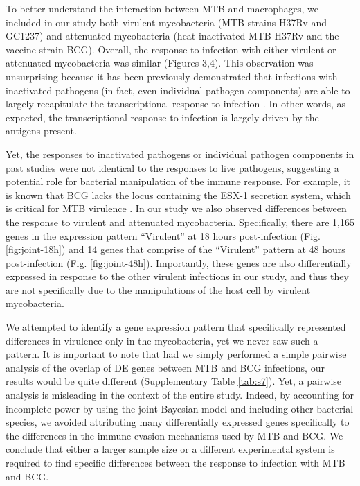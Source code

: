 To better understand the interaction between MTB and macrophages, we
included in our study both virulent mycobacteria (MTB strains H37Rv and
GC1237) and attenuated mycobacteria (heat-inactivated MTB H37Rv and the
vaccine strain BCG). Overall, the response to infection with either
virulent or attenuated mycobacteria was similar (Figures 3,4). This
observation was unsurprising because it has been previously demonstrated
that infections with inactivated pathogens (in fact, even individual
pathogen components) are able to largely recapitulate the
transcriptional response to infection \citep{Huang2001, Boldrick2002,
Nau2002, Jenner2005}. In other words, as expected, the
transcriptional response to infection is largely driven by the antigens
present.

Yet, the responses to inactivated pathogens or individual pathogen
components in past studies were not identical to the responses to live
pathogens, suggesting a potential role for bacterial manipulation of the
immune response. For example, it is known that BCG lacks the locus
containing the ESX-1 secretion system, which is critical for MTB
virulence \citep{Behr1999, Pym2002, Hsu2003, Simeone2009}. In our
study we also observed differences between the response to virulent and
attenuated mycobacteria. Specifically, there are 1,165 genes in the
expression pattern ``Virulent'' at 18 hours post-infection (Fig. \ref{fig:joint-18h})
and 14 genes that comprise of the ``Virulent'' pattern at 48 hours
post-infection (Fig. \ref{fig:joint-48h}). Importantly, these genes are also
differentially expressed in response to the other virulent infections in
our study, and thus they are not specifically due to the manipulations
of the host cell by virulent mycobacteria.

We attempted to identify a gene expression pattern that specifically
represented differences in virulence only in the mycobacteria, yet we
never saw such a pattern. It is important to note that had we simply
performed a simple pairwise analysis of the overlap of DE genes between
MTB and BCG infections, our results would be quite different
(Supplementary Table \ref{tab:s7}). Yet, a pairwise analysis is misleading in the
context of the entire study. Indeed, by accounting for incomplete power
by using the joint Bayesian model and including other bacterial species,
we avoided attributing many differentially expressed genes specifically
to the differences in the immune evasion mechanisms used by MTB and BCG.
We conclude that either a larger sample size or a different experimental
system is required to find specific differences between the response to
infection with MTB and BCG.

